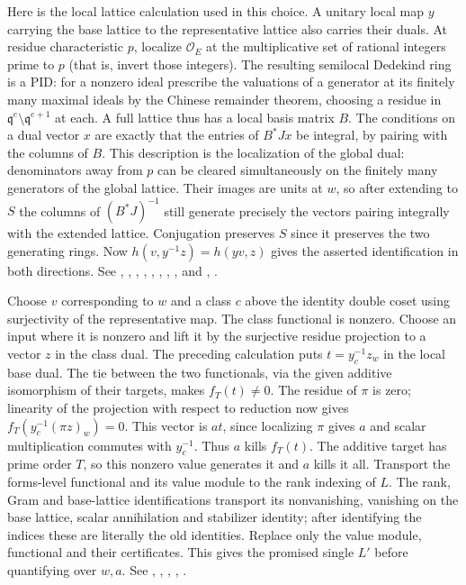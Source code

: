 Here is the local lattice calculation used in this choice. A unitary
local map $y$ carrying the base lattice to the representative lattice
also carries their duals. At residue characteristic $p$, localize
$\mathcal O_E$ at the multiplicative set of rational integers prime to $p$ (that is,
invert those integers). The resulting semilocal Dedekind ring is a PID:
for a nonzero ideal prescribe the valuations of a generator at its
finitely many maximal ideals by the Chinese remainder theorem, choosing
a residue in $\mathfrak q^e\setminus\mathfrak q^{e+1}$ at each.
A full lattice thus has a local basis matrix $B$. The conditions on a
dual vector $x$ are exactly that the entries of $B^*Jx$ be integral,
by pairing with the columns of $B$. This description is the localization
of the global dual: denominators away from $p$ can be cleared
simultaneously on the finitely many generators of the global lattice.
Their images are units at $w$, so after extending to $S$ the columns
of $(B^*J)^{-1}$ still generate precisely the vectors pairing
integrally with the extended lattice. Conjugation preserves $S$ since
it preserves the two generating rings. Now
$h(v,y^{-1}z)=h(yv,z)$ gives the asserted identification in both
directions. See ,
,
,
,
, , ,
, and
, .

Choose $v$ corresponding to $w$ and a class $c$ above the identity
double coset using surjectivity of the representative map. The class
functional is nonzero. Choose an input where it is nonzero and lift it
by the surjective residue projection to a vector $z$ in the class dual.
The preceding calculation puts $t=y_c^{-1}z_w$ in the local base dual.
The tie between the two functionals, via the given additive isomorphism
of their targets, makes $f_T(t)\ne0$. The residue of $\pi$ is zero;
linearity of the projection with respect to reduction now gives
$f_T(y_c^{-1}(\pi z)_w)=0$. This vector is $at$, since localizing
$\pi$ gives $a$ and scalar multiplication commutes with $y_c^{-1}$.
Thus $a$ kills $f_T(t)$. The additive target has prime order $T$, so
this nonzero value generates it and $a$ kills it all.
Transport the forms-level functional and its value module to the
rank indexing of $L$. The rank, Gram and base-lattice identifications
transport its nonvanishing, vanishing on the base lattice, scalar
annihilation and stabilizer identity; after identifying the indices
these are literally the old identities. Replace only the value module,
functional and their certificates. This gives the promised single $L'$
before quantifying over $w,a$.
See , ,
,
,
.

